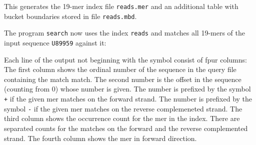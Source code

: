 \documentclass[12pt]{article}
\newcommand{\Programname}[1]{\texttt{\small #1}}
\newcommand{\TYsearch}[0]{\Programname{search}\xspace}
\begin{document}

This generates the 19-mer index file \texttt{reads.mer} and an additional
table with bucket boundaries stored in file \texttt{reads.mbd}.

The program \TYsearch now uses the index \texttt{reads} and
matches all 19-mers of the input sequence \texttt{U89959} against it:


Each line of the output not beginning with the symbol \texttt{}
consist of fpur columns: The first column shows the ordinal number of the
sequence in the query file containing the match match. The second number
is the offset in the sequence (counting from 0) whose number is given.
The number is prefixed by the symbol \texttt{+} if the given mer
matches on the forward strand.
The number is prefixed by the symbol \texttt{-} if the given mer
matches on the reverse complemeneted strand. The third column shows
the occurrence count for the mer in the index. There are separated 
counts for the matches on the forward and the reverse complemented strand.
The fourth column shows the mer in forward direction. 


\end{document}
